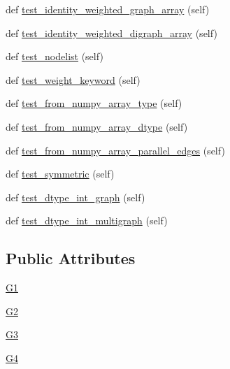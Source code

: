 \begin{DoxyCompactItemize}
def \hyperlink{classnetworkx_1_1tests_1_1test__convert__numpy_1_1TestConvertNumpyArray_a0ebbe400375339aa8f164bf6dc6c63b0}{test\+\_\+identity\+\_\+weighted\+\_\+graph\+\_\+array} (self)
\item 
def \hyperlink{classnetworkx_1_1tests_1_1test__convert__numpy_1_1TestConvertNumpyArray_a853caba99aacd91a85c2455f85f87f1d}{test\+\_\+identity\+\_\+weighted\+\_\+digraph\+\_\+array} (self)
\item 
def \hyperlink{classnetworkx_1_1tests_1_1test__convert__numpy_1_1TestConvertNumpyArray_aa96c7199007d1af19b74d1dacaf07c82}{test\+\_\+nodelist} (self)
\item 
def \hyperlink{classnetworkx_1_1tests_1_1test__convert__numpy_1_1TestConvertNumpyArray_aa55d22236ea90bfd836d4dd6da713643}{test\+\_\+weight\+\_\+keyword} (self)
\item 
def \hyperlink{classnetworkx_1_1tests_1_1test__convert__numpy_1_1TestConvertNumpyArray_a151c36c8730889173a4a10e2c21111a3}{test\+\_\+from\+\_\+numpy\+\_\+array\+\_\+type} (self)
\item 
def \hyperlink{classnetworkx_1_1tests_1_1test__convert__numpy_1_1TestConvertNumpyArray_a32a38522c9cac45cc9aefe766987e4a4}{test\+\_\+from\+\_\+numpy\+\_\+array\+\_\+dtype} (self)
\item 
def \hyperlink{classnetworkx_1_1tests_1_1test__convert__numpy_1_1TestConvertNumpyArray_a61522d8003d4d471f21fe50b5ab8b270}{test\+\_\+from\+\_\+numpy\+\_\+array\+\_\+parallel\+\_\+edges} (self)
\item 
def \hyperlink{classnetworkx_1_1tests_1_1test__convert__numpy_1_1TestConvertNumpyArray_ab960b92493f22bcead3ebbab62f444ab}{test\+\_\+symmetric} (self)
\item 
def \hyperlink{classnetworkx_1_1tests_1_1test__convert__numpy_1_1TestConvertNumpyArray_a63375beb21317a4072c516878244155f}{test\+\_\+dtype\+\_\+int\+\_\+graph} (self)
\item 
def \hyperlink{classnetworkx_1_1tests_1_1test__convert__numpy_1_1TestConvertNumpyArray_a255d3bf40e56bdc228f4920ef9d3552b}{test\+\_\+dtype\+\_\+int\+\_\+multigraph} (self)
\end{DoxyCompactItemize}
\subsection*{Public Attributes}
\begin{DoxyCompactItemize}
\item 
\hyperlink{classnetworkx_1_1tests_1_1test__convert__numpy_1_1TestConvertNumpyArray_a04d5a733720580f5037b8134ebe52b73}{G1}
\item 
\hyperlink{classnetworkx_1_1tests_1_1test__convert__numpy_1_1TestConvertNumpyArray_a0ccb237a760b3c34a2ce91e0248b6f9c}{G2}
\item 
\hyperlink{classnetworkx_1_1tests_1_1test__convert__numpy_1_1TestConvertNumpyArray_a3e2ff7b9d6036a20c6cb273239935278}{G3}
\item 
\hyperlink{classnetworkx_1_1tests_1_1test__convert__numpy_1_1TestConvertNumpyArray_a0208e542e6bb3ec9232eb72614ebf2d5}{G4}
\end{DoxyCompactItemize}


